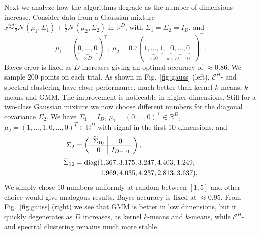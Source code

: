 \documentclass{article}
\DeclareMathOperator{\diag}{diag}
\begin{document}
Next we analyze
how the algorithms degrade as the number of dimensions increase.
Consider data from a Gaussian mixture
$x  \stackrel{iid}{\sim} 
\tfrac{1}{2} \mathcal{N}(\mu_1,\Sigma_1) +
\tfrac{1}{2} \mathcal{N}(\mu_2,\Sigma_2)$ in $\mathbb{R}^D$, with
$\Sigma_1=\Sigma_2 = I_D$,  and
\begin{equation}
\label{eq:gauss1}
\mu_1 = (\underbrace{0,\dotsc,0}_{\times D})^\top, \
\mu_2 = 0.7 (\underbrace{1,\dots,1}_{\times 10},
\underbrace{0,\dots,0}_{\times (D-10)})^\top.
\end{equation}
Bayes error is fixed as $D$ increases giving an optimal accuracy
of $\approx 0.86$.
We sample $200$ points on each trial.
As shown in Fig.~\ref{fig:gauss} (left), 
$\mathcal{E}^H$- and spectral clustering have close
performance,  
much better than kernel $k$-means, 
$k$-means and GMM. The improvement is noticeable in 
higher dimensions.
Still for a two-class Gaussian mixture we now choose
different numbers for the  diagonal covariance $\Sigma_2$.
We have $\Sigma_1=I_D$, $\mu_1=(0,\dotsc,0)^\top \in \mathbb{R}^D$,
$\mu_2=(1,\dotsc,1,0,\dotsc,0)^T \in \mathbb{R}^D$ 
with signal in the first $10$ dimensions, and
\begin{equation}
\label{eq:gauss2}
\begin{split}
\Sigma_2 &= \left( \begin{array}{c|c}
\widetilde{\Sigma}_{10} & 0 \\ \hline 
0 & I_{D-10} \end{array}\right), \\
\widetilde{\Sigma}_{10} &= \diag(1.367,  3.175,  3.247,  4.403,  1.249,\\
&\hspace{3.6em}1.969, 4.035,   4.237,  2.813,  3.637).
\end{split}
\end{equation}
We simply chose $10$ numbers uniformly at random between
$[1,5]$ and other choice would give analogous results.
Bayes  accuracy is fixed at $\approx 0.95$.
From Fig.~\ref{fig:gauss} (right) we see that 
GMM is better in low dimensions, 
but it quickly degenerates
as $D$ increases, as kernel $k$-means and $k$-means, while  
$\mathcal{E}^H$- and spectral clustering remains much more stable. 
\end{document}

